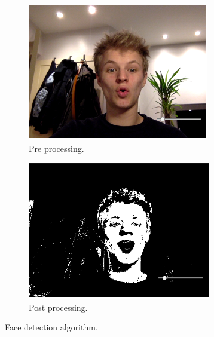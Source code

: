 \begin{figure}[H]
    \centering
    \begin{subfigure}[b]{0.45\textwidth}
        \centering
        \includegraphics[width=\textwidth]{chrispre}
        \caption{Pre processing.}
        \label{chrispre}
    \end{subfigure}
    \hfill
    \begin{subfigure}[b]{0.45\textwidth}
        \centering
        \includegraphics[width=\textwidth]{chrispost}
        \caption{Post processing.}
        \label{chrispost}
    \end{subfigure}
    \hfill
    \caption{Face detection algorithm.}
    \label{edge detection}
\end{figure}


